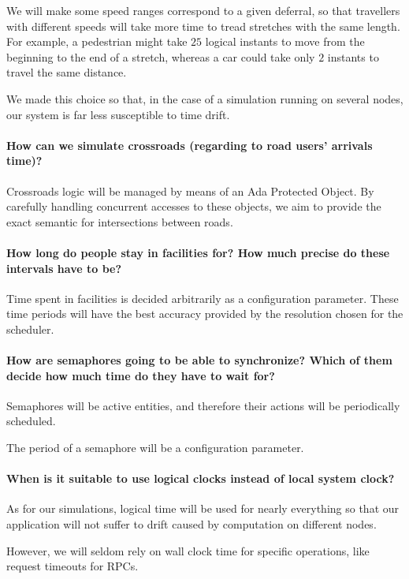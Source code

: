 
We will make some speed ranges correspond to a given deferral, so that
travellers with different speeds will take more time to tread stretches with
the same length. For example, a pedestrian might take $25$ logical instants to
move from the beginning to the end of a stretch, whereas a car could take only
$2$ instants to travel the same distance.

We made this choice so that, in the case of a simulation running on several
nodes, our system is far less susceptible to time drift.

\paragraph{How can we simulate crossroads (regarding to road users' arrivals
  time)?}
Crossroads logic will be managed by means of an Ada Protected Object. By
carefully handling concurrent accesses to these objects, we aim to provide the
exact semantic for intersections between roads.

\paragraph{How long do people stay in facilities for? How much precise do these
  intervals have to be?}
Time spent in facilities is decided arbitrarily as a configuration parameter.
These time periods will have the best accuracy provided by the resolution
chosen for the scheduler.

\paragraph{How are semaphores going to be able to synchronize? Which of them
  decide how much time do they have to wait for?}
Semaphores will be active entities, and therefore their actions will be
periodically scheduled.

The period of a semaphore will be a configuration parameter.

\paragraph{When is it suitable to use logical clocks instead of local system
  clock?}
As for our simulations, logical time will be used for nearly everything so that
our application will not suffer to drift caused by computation on different
nodes.

However, we will seldom rely on wall clock time for specific operations, like
request timeouts for RPCs.
